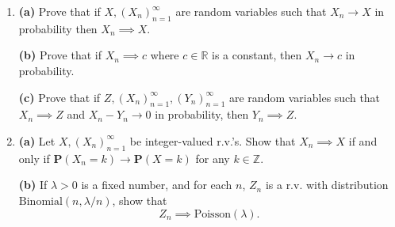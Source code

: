 \documentclass[12pt]{article}
\newcommand{\R}{\mathbb{R}}
\newcommand{\Z}{\mathbb{Z}}
\newcommand{\prob}{\mathbf{P}}
\theoremstyle{example}
\begin{document}
\begin{enumerate}
\medskip\noindent
(b) Find $\lim_{n\to\infty} e^{-n} \sum_{k=0}^n \frac{n^k}{k!}$.

\medskip\noindent
(c) If $X_1,X_2,\ldots$ are i.i.d.\ $\textrm{Exp}(1)$ random variables and denote $S_n=\sum_{k=1}^n X_k$ (so $S_n \sim \textrm{Gamma}(n,1)$), $\hat{S}_n = (S_n-n)/\sqrt{n}$. Show that if $n$ is large and $x\in \R$ is fixed then the density of $\hat{S}_n$ satisfies
$$ f_{\hat{S}_n}(x) \approx \varphi(x). $$

\paragraph{4.} Prove that if $X\sim N(\mu_1, \sigma_1^2)$ and $Y\sim N(\mu_2, \sigma_2^2)$ are independent r.v.'s, then $X+Y \sim N(\mu_1+\mu_2, \sigma_1^2+\sigma_2^2)$.

\medskip\noindent \textbf{Hint.} First, show why it is enough to prove the following statement: If $U,V \sim N(0,1)$ are independent and $a^2+b^2 = 1$, then $W=aU+bV \sim N(0,1)$. Then, to prove this, introduce another auxiliary variable $Z=-bU+aV$, and consider the two-dimensional transformation $(U,V)\to(W,Z)$. Apply the formula 
$$ f_{\phi(U,V)}(w,z) = \frac{1}{|J_\phi(\phi^{-1}(w,z))|} f_{U,V}(\phi^{-1}(w,z)) $$
for the density of a transformed random $2$-d vector to get the joint density of $W,Z$.



\item \textbf{(a)} Prove that if $X, (X_n)_{n=1}^\infty$ are random variables such that $X_n \to X$ in probability then $X_n \implies X$.

\medskip\noindent
\textbf{(b)} Prove that if $X_n \implies c$ where $c\in \R$ is a constant, then $X_n \to c$ in probability.

\medskip\noindent
\textbf{(c)} Prove that if $Z, (X_n)_{n=1}^\infty, (Y_n)_{n=1}^\infty$ are random variables such that $X_n \implies Z$ and $X_n-Y_n\to 0$ in probability, then $Y_n \implies Z$.


\item \textbf{(a)} Let $X, (X_n)_{n=1}^\infty$ be integer-valued r.v.'s. Show that $X_n\implies X$ if and only if
$ \prob(X_n=k)\to \prob(X=k)$ for any $k\in\Z$.

\medskip \noindent
\textbf{(b)} If $\lambda >0$ is a fixed number, and for each $n$, $Z_n$ is a r.v. with distribution $\textrm{Binomial}(n,\lambda/n)$, show that
$$ Z_n \implies \textrm{Poisson}(\lambda). $$




\end{enumerate}
\end{document}
